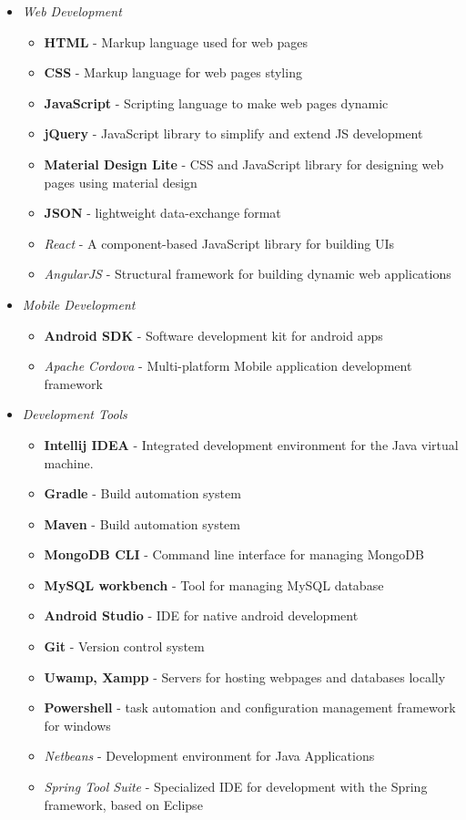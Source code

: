 \documentclass[12pt]{article}
\begin{document}
\begin{itemize}[leftmargin=20pt]
	\item \textit{Web Development}
	\begin{itemize}
		\item \textbf{HTML} - Markup language used for web pages
		\item \textbf{CSS} - Markup language for web pages styling
		\item \textbf{JavaScript} - Scripting language to make web pages dynamic
		\item \textbf{jQuery} - JavaScript library to simplify and extend JS development
		\item \textbf{Material Design Lite} - CSS and JavaScript library for designing web pages using material design
		\item \textbf{JSON} - lightweight data-exchange format
		\item \textit{React} - A component-based JavaScript library for building UIs
		\item \textit{AngularJS} - Structural framework for building dynamic web applications
		
	\end{itemize}

	\item \textit{Mobile Development}
	\begin{itemize}
		\item \textbf{Android SDK} - Software development kit for android apps
		\item \textit{Apache Cordova} - Multi-platform Mobile application development framework
	\end{itemize}
	\item \textit{Development Tools}
	\begin{itemize}
		\item \textbf{Intellij IDEA} - Integrated development environment for the Java virtual machine.
		\item \textbf{Gradle} - Build automation system
		\item \textbf{Maven} - Build automation system
		\item \textbf{MongoDB CLI} - Command line interface for managing MongoDB 
		\item \textbf{MySQL workbench} - Tool for managing MySQL database
		\item \textbf{Android Studio} - IDE for native android development
		\item \textbf{Git} - Version control system
		\item \textbf{Uwamp, Xampp} - Servers for hosting webpages and databases locally
		\item \textbf{Powershell} - task automation and configuration management framework for windows
		\item \textit{Netbeans} - Development environment for Java Applications
		\item \textit{Spring Tool Suite} - Specialized IDE for development with the Spring framework, based on Eclipse
	\end{itemize}
	
	
	
	 
\end{itemize}
\end{document}
